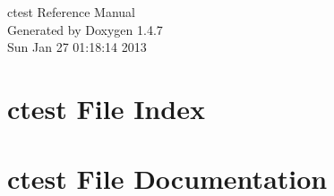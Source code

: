 \documentclass[a4paper]{book}
\begin{document}
\begin{titlepage}
\vspace*{7cm}
\begin{center}
{\Large ctest Reference Manual}\\
\vspace*{1cm}
{\large Generated by Doxygen 1.4.7}\\
\vspace*{0.5cm}
{\small Sun Jan 27 01:18:14 2013}\\
\end{center}
\end{titlepage}
\clearemptydoublepage
{}
\tableofcontents
\clearemptydoublepage
{}
\chapter{ctest File Index}

\chapter{ctest File Documentation}







\printindex
\end{document}
